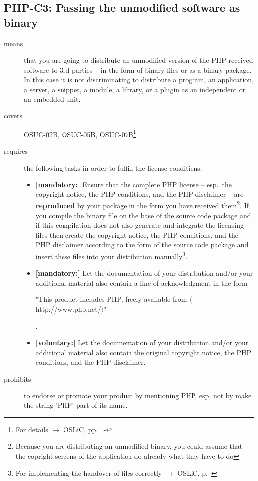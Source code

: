 \subsection{PHP-C3: Passing the unmodified software as binary}
\label{OSUC-02B-PHP} \label{OSUC-05B-PHP} \label{OSUC-07B-PHP} 

\begin{description}

\item[means] that you are going to distribute an unmodified version of the PHP
received software to 3rd parties -- in the form of binary files or as a
bi\-na\-ry package. In this case it is not discriminating to distribute a
program, an application, a server, a snippet, a module, a library, or a plugin
as an independent or an embedded unit.

\item[covers] OSUC-02B, OSUC-05B, OSUC-07B\footnote{For details $\rightarrow$
OSLiC, pp.\ \pageref{OSUC-02B-DEF} - \pageref{OSUC-07B-DEF}}

\item[requires] the following tasks in order to fulfill the license conditions:
\begin{itemize}

  \item \textbf{[mandatory:]} Ensure that the complete PHP license -- esp.\ the
  copyright notice, the PHP conditions, and the PHP disclaimer -- are
  \textbf{reproduced} by your package in the form you have received
  them\footnote{Because you are distributing an unmodified binary, you could
  assume that the copright screens of the application do already what they have
  to do}. If you compile the binary file on the base of the source code package
  and if this compilation does not also generate and integrate the licensing
  files then create the copyright notice, the PHP conditions, and the PHP
  disclaimer according to the form of the source code package and insert these
  files into your distribution manually\footnote{For implementing the handover
  of files correctly $\rightarrow$ OSLiC, p.\ \pageref{DistributingFilesHint}}.
  
  \item \textbf{[mandatory:]} Let the documentation of your distribution and/or
  your additional material also contain a line of acknowledgment in the form
   \begin{footnotesize}"This product includes PHP, freely available from
  $\langle$http://www.php.net/$\rangle$"\end{footnotesize}.
    
  \item \textbf{[voluntary:]} Let the documentation of your distribution and/or
  your additional material also contain the original copyright notice, the PHP
  conditions, and the PHP disclaimer.

\end{itemize}

\item[prohibits] to endorse or promote your product by mentioning PHP, esp. not
by make the string 'PHP' part of its name.

\end{description}

